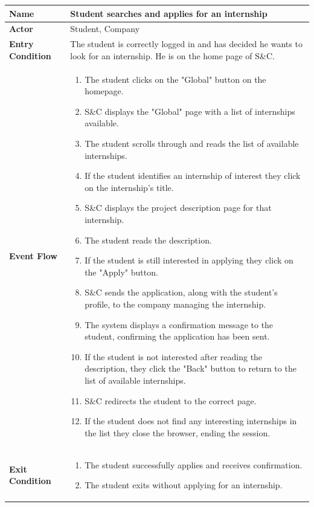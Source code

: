 \begin{longtable}{|p{}|p{}|}
\hline
\textbf{Name} &  Student searches and applies for an internship\\
\hline
\textbf{Actor} &  Student, Company\\
\hline
\textbf{Entry Condition} &  The student is correctly logged in and has decided he wants to look for an internship. He is on the home page of S\&C.\\
\hline
\textbf{Event Flow} &  
\begin{enumerate}
    \item  The student clicks on the "Global" button on the homepage.
    \item S\&C displays the "Global" page with a list of internships available.
    \item The student scrolls through and reads the list of available internships.
    \item If the student identifies an internship of interest they click on the internship's title.
    \item S\&C displays the project description page for that internship.
    \item The student reads the description.
    \item If the student is still interested in applying they click on the "Apply" button.
    \item S\&C sends the application, along with the student's profile, to the company managing the internship.
    \item The system displays a confirmation message to the student, confirming the application has been sent.
    \item If the student is not interested after reading the description, they click the "Back" button to return to the list of available internships.
    \item S\&C redirects the student to the correct page.
    \item  If the student does not find any interesting internships in the list they close the browser, ending the session.
\end{enumerate} \\
\hline
\textbf{Exit Condition} &  
\begin{enumerate}
    \item  The student successfully applies and receives confirmation.
    \item The student exits without applying for an internship.
\end{enumerate}\\

\end{longtable}
